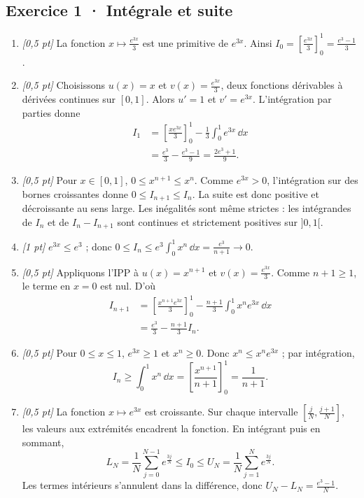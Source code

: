 \subsection*{Exercice 1 · Intégrale et suite}\begin{enumerate}

\item \textit{[0{,}5 pt]} La fonction $x\mapsto \frac{e^{3x}}{3}$ est une primitive de $e^{3x}$. Ainsi $I_0=[\frac{e^{3x}}{3}]_0^1=\frac{e^{3}-1}{3}$.

\item \textit{[0{,}5 pt]} Choisissons $u(x)=x$ et $v(x)=\frac{e^{3x}}{3}$, deux fonctions dérivables à dérivées continues sur $[0,1]$. Alors $u'=1$ et $v'=e^{3x}$. L'intégration par parties donne
\[\begin{aligned}I_1&=\left[\frac{xe^{3x}}{3}\right]_0^1-\frac{1}{3}\int_0^1e^{3x}\,\dd x\\&=\frac{e^{3}}{3}-\frac{e^{3}-1}{9}=\frac{2e^{3}+1}{9}.\end{aligned}\]

\item \textit{[0{,}5 pt]} Pour $x\in[0,1]$, $0\le x^{n+1}\le x^n$. Comme $e^{3x}>0$, l'intégration sur des bornes croissantes donne $0\le I_{n+1}\le I_n$. La suite est donc positive et décroissante au sens large. Les inégalités sont même strictes : les intégrandes de $I_n$ et de $I_n-I_{n+1}$ sont continues et strictement positives sur $]0,1[$.

\item \textit{[1 pt]} $e^{3x}\le e^{3}$ ; donc $0\le I_n\le e^{3}\int_0^1x^n\,\dd x=\frac{e^{3}}{n+1}\to0$.

\item \textit{[0{,}5 pt]} Appliquons l'IPP à $u(x)=x^{n+1}$ et $v(x)=\frac{e^{3x}}{3}$. Comme $n+1\ge1$, le terme en $x=0$ est nul. D'où
\[\begin{aligned}I_{n+1}&=\left[\frac{x^{n+1}e^{3x}}{3}\right]_0^1-\frac{n+1}{3}\int_0^1x^ne^{3x}\,\dd x\\&=\frac{e^{3}}{3}-\frac{n+1}{3}I_n.\end{aligned}\]

\item \textit{[0{,}5 pt]} Pour $0\le x\le1$, $e^{3x}\ge1$ et $x^n\ge0$. Donc $x^n\le x^ne^{3x}$ ; par intégration,
\[I_n\ge\int_0^1x^n\,\dd x=\left[\frac{x^{n+1}}{n+1}\right]_0^1=\frac{1}{n+1}.\]

\item \textit{[0{,}5 pt]} La fonction $x\mapsto e^{3x}$ est croissante. Sur chaque intervalle $[\frac{j}{N},\frac{j+1}{N}]$, les valeurs aux extrémités encadrent la fonction. En intégrant puis en sommant,
\[L_N=\frac{1}{N}\sum_{j=0}^{N-1}e^{\frac{3j}{N}}\le I_0\le U_N=\frac{1}{N}\sum_{j=1}^Ne^{\frac{3j}{N}}.\]
Les termes intérieurs s'annulent dans la différence, donc $U_N-L_N=\frac{e^{3}-1}{N}$.


\end{enumerate}
